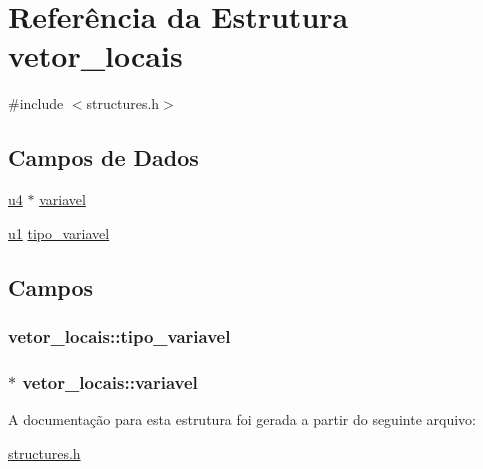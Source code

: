 \hypertarget{structvetor__locais}{}\section{Referência da Estrutura vetor\+\_\+locais}
\label{structvetor__locais}


{\ttfamily \#include $<$structures.\+h$>$}

\subsection*{Campos de Dados}
\begin{DoxyCompactItemize}
\item 
\hyperlink{lista__operandos_8h_ae5be1f726785414dd1b77d60df074c9d}{u4} $\ast$ \hyperlink{structvetor__locais_a474212032f52e10c83331da9efdbf0e8}{variavel}
\item 
\hyperlink{lista__operandos_8h_ad9f4cdb6757615aae2fad89dab3c5470}{u1} \hyperlink{structvetor__locais_a8f30386b3b7757677d00d6e14e535278}{tipo\+\_\+variavel}
\end{DoxyCompactItemize}


\subsection{Campos}
\subsubsection[{\texorpdfstring{tipo\+\_\+variavel}{tipo_variavel}}]{ vetor\+\_\+locais\+::tipo\+\_\+variavel}\hypertarget{structvetor__locais_a8f30386b3b7757677d00d6e14e535278}{}\label{structvetor__locais_a8f30386b3b7757677d00d6e14e535278}
\subsubsection[{\texorpdfstring{variavel}{variavel}}]{$\ast$ vetor\+\_\+locais\+::variavel}\hypertarget{structvetor__locais_a474212032f52e10c83331da9efdbf0e8}{}\label{structvetor__locais_a474212032f52e10c83331da9efdbf0e8}


A documentação para esta estrutura foi gerada a partir do seguinte arquivo\+:\begin{DoxyCompactItemize}
\item 
\hyperlink{structures_8h}{structures.\+h}\end{DoxyCompactItemize}
